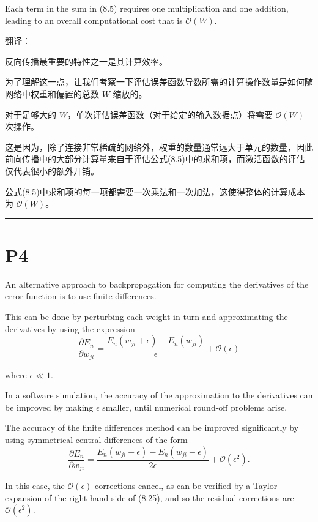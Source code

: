 \documentclass{article}
\begin{document}
Each term in the sum in (8.5) requires one multiplication and one addition, leading to an overall computational cost that is $\mathcal{O}(W)$.

{\color{red}
翻译：

反向传播最重要的特性之一是其计算效率。

为了理解这一点，让我们考察一下评估误差函数导数所需的计算操作数量是如何随网络中权重和偏置的总数 $W$ 缩放的。

对于足够大的 $W$，单次评估误差函数（对于给定的输入数据点）将需要 $\mathcal{O}(W)$ 次操作。

这是因为，除了连接非常稀疏的网络外，权重的数量通常远大于单元的数量，因此前向传播中的大部分计算量来自于评估公式(8.5)中的求和项，而激活函数的评估仅代表很小的额外开销。

公式(8.5)中求和项的每一项都需要一次乘法和一次加法，这使得整体的计算成本为 $\mathcal{O}(W)$。
}

\noindent\rule{\linewidth}{0.4pt}

\section{P4}

An alternative approach to backpropagation for computing the derivatives of the error function is to use finite differences. 

This can be done by perturbing each weight in turn and approximating the derivatives by using the expression
\begin{equation}
\frac{\partial E_n}{\partial w_{ji}} = \frac{E_n(w_{ji} + \epsilon) - E_n(w_{ji})}{\epsilon} + \mathcal{O}(\epsilon) \tag{8.24}
\end{equation}

where $\epsilon \ll 1$. 

In a software simulation, the accuracy of the approximation to the derivatives can be improved by making $\epsilon$ smaller, until numerical round-off problems arise. 

The accuracy of the finite differences method can be improved significantly by using symmetrical central differences of the form
\begin{equation}
\frac{\partial E_n}{\partial w_{ji}} = \frac{E_n(w_{ji} + \epsilon) - E_n(w_{ji} - \epsilon)}{2\epsilon} + \mathcal{O}(\epsilon^2). 
\tag{8.25}
\end{equation}

In this case, the $\mathcal{O}(\epsilon)$ corrections cancel, as can be verified by a Taylor expansion of the right-hand side of (8.25), and so the residual corrections are $\mathcal{O}(\epsilon^2)$. 
\end{document}
